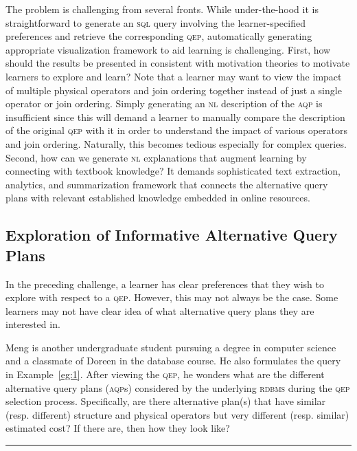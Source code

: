 \documentclass[11pt]{article}
\newcommand{\eat}[1]{}
\def\EndOfProof{\nolinebreak\ \hfill\rule{1.5mm}{2.7mm}}
\begin{document}
The problem is challenging from several fronts. While under-the-hood it is straightforward to generate an \textsc{sql} query involving the learner-specified preferences and retrieve the corresponding \textsc{qep}, automatically generating appropriate visualization framework to aid learning is challenging. First, how should the results be presented in consistent with motivation theories to motivate learners to explore and learn? Note that a learner may want to view the impact of multiple physical operators and join ordering together instead of just a single operator or join ordering. Simply generating an \textsc{nl} description of the \textsc{aqp} is insufficient since this will demand a learner to manually compare the description of the original \textsc{qep} with it in order to understand the impact of various operators and join ordering. Naturally, this becomes tedious especially for complex queries.  Second, how can we generate  \textsc{nl} explanations that augment learning by connecting with textbook knowledge? It demands sophisticated text extraction, analytics, and summarization framework that connects the alternative query plans with relevant established knowledge embedded in online resources.   

\subsection{Exploration of Informative Alternative Query Plans} 
In the preceding challenge, a learner has clear preferences that they wish to explore with respect to a \textsc{qep}. However, this may not always be the case.  Some learners may not have clear idea of what alternative query plans they are interested in.\eat{ Consider the following example scenario.} 

\begin{example}\label{eg:3}
 Meng is another undergraduate student pursuing a degree in computer science and a classmate of Doreen in the database course. He also formulates the query in Example~\ref{eg:1}. After viewing the \textsc{qep}, he wonders what are the different alternative query plans (\textsc{aqp}s) considered by the underlying \textsc{rdbms} during the \textsc{qep} selection process. Specifically, are there alternative plan(s) that have similar (resp. different) structure and physical operators but very different (resp. similar) estimated cost? If there are, then how they look like? 
\EndOfProof
\end{example}
\end{document}
